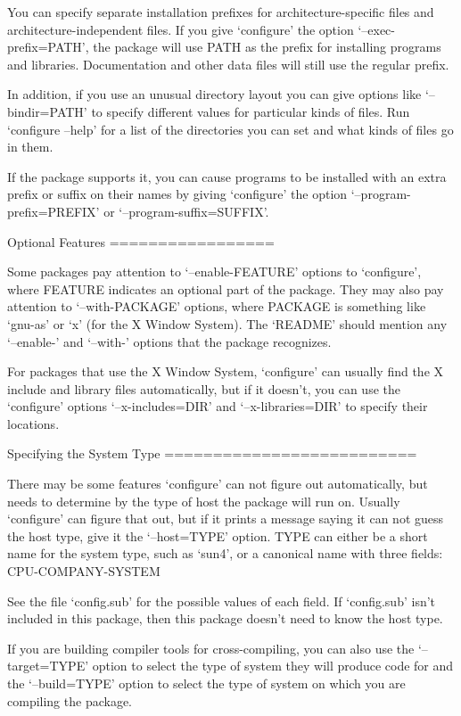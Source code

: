 \begin{DoxyCodeInclude}
   You can specify separate installation prefixes for
architecture-specific files and architecture-independent files.  If you
give `configure' the option `--exec-prefix=PATH', the package will use
PATH as the prefix for installing programs and libraries.
Documentation and other data files will still use the regular prefix.

   In addition, if you use an unusual directory layout you can give
options like `--bindir=PATH' to specify different values for particular
kinds of files.  Run `configure --help' for a list of the directories
you can set and what kinds of files go in them.

   If the package supports it, you can cause programs to be installed
with an extra prefix or suffix on their names by giving `configure' the
option `--program-prefix=PREFIX' or `--program-suffix=SUFFIX'.

Optional Features
=================

   Some packages pay attention to `--enable-FEATURE' options to
`configure', where FEATURE indicates an optional part of the package.
They may also pay attention to `--with-PACKAGE' options, where PACKAGE
is something like `gnu-as' or `x' (for the X Window System).  The
`README' should mention any `--enable-' and `--with-' options that the
package recognizes.

   For packages that use the X Window System, `configure' can usually
find the X include and library files automatically, but if it doesn't,
you can use the `configure' options `--x-includes=DIR' and
`--x-libraries=DIR' to specify their locations.

Specifying the System Type
==========================

   There may be some features `configure' can not figure out
automatically, but needs to determine by the type of host the package
will run on.  Usually `configure' can figure that out, but if it prints
a message saying it can not guess the host type, give it the
`--host=TYPE' option.  TYPE can either be a short name for the system
type, such as `sun4', or a canonical name with three fields:
     CPU-COMPANY-SYSTEM

See the file `config.sub' for the possible values of each field.  If
`config.sub' isn't included in this package, then this package doesn't
need to know the host type.

   If you are building compiler tools for cross-compiling, you can also
use the `--target=TYPE' option to select the type of system they will
produce code for and the `--build=TYPE' option to select the type of
system on which you are compiling the package.


\end{DoxyCodeInclude}
